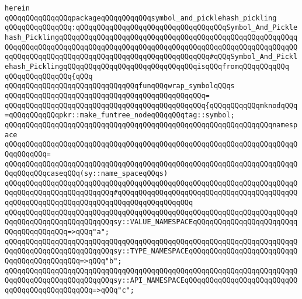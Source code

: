 \verb|herein|\newline
\newline
\verb|qQQqqQQqqQQqqQQqpackageqQQqqQQqqQQqsymbol_and_picklehash_pickling|\newline
\verb|qQQqqQQqqQQqqQQq:qQQqqQQqqQQqqQQqqQQqqQQqqQQqqQQqqQQqSymbol_And_Picklehash_PicklingqQQqqQQqqQQqqQQqqQQqqQQqqQQqqQQqqQQqqQQqqQQqqQQqqQQqqQQqqQQqqQQqqQQqqQQqqQQqqQQqqQQqqQQqqQQqqQQqqQQqqQQqqQQqqQQqqQQqqQQqqQQqqQQqqQQqqQQqqQQqqQQqqQQqqQQqqQQqqQQqqQQqqQQqqQQqqQQq#qQQqSymbol_And_Picklehash_PicklingqQQqqQQqqQQqqQQqqQQqqQQqqQQqqQQqisqQQqfromqQQqqQQqqQQq|\newline
\verb|qQQqqQQqqQQqqQQq{qQQq|\newline
\verb|qQQqqQQqqQQqqQQqqQQqqQQqqQQqqQQqfunqQQqwrap_symbolqQQqs|\newline
\verb|qQQqqQQqqQQqqQQqqQQqqQQqqQQqqQQqqQQqqQQqqQQqqQQq=|\newline
\verb|qQQqqQQqqQQqqQQqqQQqqQQqqQQqqQQqqQQqqQQqqQQqqQQq{qQQqqQQqqQQqmknodqQQq=qQQqqQQqqQQqpkr::make_funtree_nodeqQQqqQQqtag::symbol;|\newline
\newline
\verb|qQQqqQQqqQQqqQQqqQQqqQQqqQQqqQQqqQQqqQQqqQQqqQQqqQQqqQQqqQQqqQQqnamespace|\newline
\verb|qQQqqQQqqQQqqQQqqQQqqQQqqQQqqQQqqQQqqQQqqQQqqQQqqQQqqQQqqQQqqQQqqQQqqQQqqQQqqQQq=|\newline
\verb|qQQqqQQqqQQqqQQqqQQqqQQqqQQqqQQqqQQqqQQqqQQqqQQqqQQqqQQqqQQqqQQqqQQqqQQqqQQqqQQqcaseqQQq(sy::name_spaceqQQqs)|\newline
\verb|qQQqqQQqqQQqqQQqqQQqqQQqqQQqqQQqqQQqqQQqqQQqqQQqqQQqqQQqqQQqqQQqqQQqqQQqqQQqqQQqqQQqqQQqqQQqqQQq#qQQqqQQqqQQqqQQqqQQqqQQqqQQqqQQqqQQqqQQqqQQqqQQqqQQqqQQqqQQqqQQqqQQqqQQqqQQqqQQqqQQqqQQq|\newline
\verb|qQQqqQQqqQQqqQQqqQQqqQQqqQQqqQQqqQQqqQQqqQQqqQQqqQQqqQQqqQQqqQQqqQQqqQQqqQQqqQQqqQQqqQQqqQQqqQQqsy::VALUE_NAMESPACEqQQqqQQqqQQqqQQqqQQqqQQqqQQqqQQqqQQqqQQq=>qQQq"a";|\newline
\verb|qQQqqQQqqQQqqQQqqQQqqQQqqQQqqQQqqQQqqQQqqQQqqQQqqQQqqQQqqQQqqQQqqQQqqQQqqQQqqQQqqQQqqQQqqQQqqQQqsy::TYPE_NAMESPACEqQQqqQQqqQQqqQQqqQQqqQQqqQQqqQQqqQQqqQQqqQQq=>qQQq"b";|\newline
\verb|qQQqqQQqqQQqqQQqqQQqqQQqqQQqqQQqqQQqqQQqqQQqqQQqqQQqqQQqqQQqqQQqqQQqqQQqqQQqqQQqqQQqqQQqqQQqqQQqsy::API_NAMESPACEqQQqqQQqqQQqqQQqqQQqqQQqqQQqqQQqqQQqqQQqqQQqqQQq=>qQQq"c";|\newline

